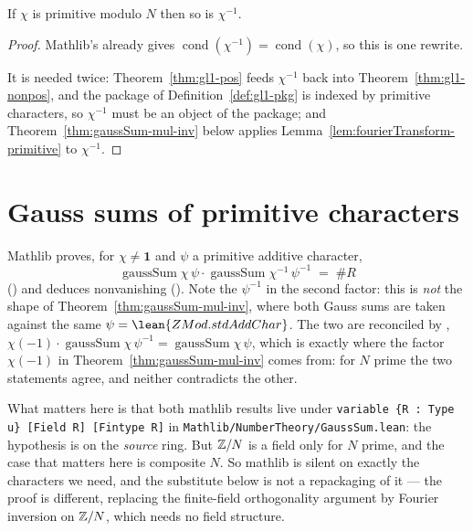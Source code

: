 \begin{lemma}
  \label{lem:primitive-inv}
  \leanok
  If $\chi$ is primitive modulo $N$ then so is $\chi^{-1}$.
\end{lemma}
\begin{proof}
  \leanok
  Mathlib's  already gives
  $\operatorname{cond}(\chi^{-1}) = \operatorname{cond}(\chi)$, so this is one rewrite.

  It is needed twice: Theorem~\ref{thm:gl1-pos} feeds $\chi^{-1}$ back into
  Theorem~\ref{thm:gl1-nonpos}, and the package of Definition~\ref{def:gl1-pkg} is
  indexed by primitive characters, so $\chi^{-1}$ must be an object of the package;
  and Theorem~\ref{thm:gaussSum-mul-inv} below applies
  Lemma~\ref{lem:fourierTransform-primitive} to $\chi^{-1}$.
\end{proof}

\section{Gauss sums of primitive characters}
\label{sec:dirichlet-gauss}

\begin{remark}
  \label{rem:gaussSum-field}
  Mathlib proves, for $\chi \neq \mathbf{1}$ and $\psi$ a primitive additive character,
  \[ \operatorname{gaussSum} \chi\, \psi \cdot
     \operatorname{gaussSum} \chi^{-1}\, \psi^{-1} \;=\; \#R \]
  () and deduces nonvanishing
  (). Note the $\psi^{-1}$ in the second
  factor: this is \emph{not} the shape of Theorem~\ref{thm:gaussSum-mul-inv}, where both
  Gauss sums are taken against the same $\psi = \lean{ZMod.stdAddChar}$. The two are
  reconciled by ,
  $\chi(-1) \cdot \operatorname{gaussSum} \chi\, \psi^{-1}
   = \operatorname{gaussSum} \chi\, \psi$, which is exactly where the factor
  $\chi(-1)$ in Theorem~\ref{thm:gaussSum-mul-inv} comes from: for $N$ prime the two
  statements agree, and neither contradicts the other.

  What matters here is that both mathlib results live under
  \verb|variable {R : Type u} [Field R] [Fintype R]| in
  \verb|Mathlib/NumberTheory/GaussSum.lean|: the hypothesis is on the \emph{source} ring.
  But $\mathbb{Z}/N$ is a field only for $N$ prime, and the case that matters here is composite
  $N$. So mathlib is silent on exactly the characters we need, and the substitute below is
  not a repackaging of it --- the proof is different, replacing the finite-field
  orthogonality argument by Fourier inversion on $\mathbb{Z}/N$, which needs no field structure.
\end{remark}


